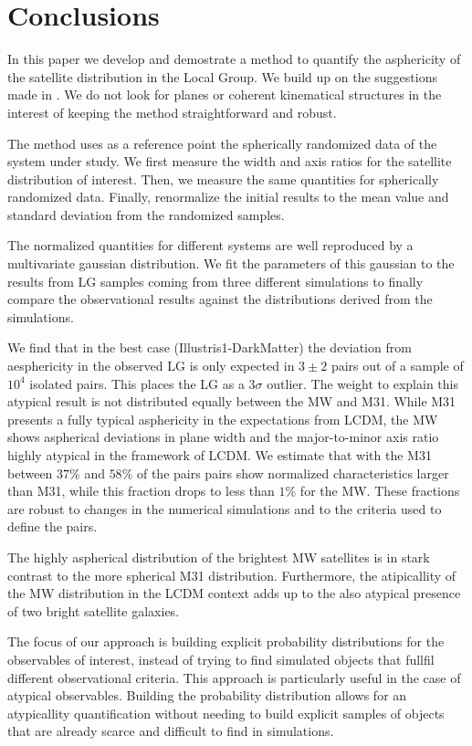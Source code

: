 \documentclass[a4paper,fleqn,usenatbib]{mnras}
\begin{document}
\section{Conclusions}

In this paper we develop and demostrate a method to quantify the
asphericity of the satellite distribution in the Local Group.
We build up on the suggestions made in \cite{XX}.
We do not look for planes or coherent kinematical structures in the
interest of keeping the method straightforward and robust.

The method uses as a reference point the spherically randomized data
of the system under study.
We first measure the width and axis ratios for the satellite
distribution of interest. 
Then, we measure the same quantities for spherically
randomized data. 
Finally, renormalize the initial results to the mean value and
standard deviation from the randomized samples.  

The normalized quantities for different systems are well reproduced by
a multivariate gaussian distribution. 
We fit the parameters of this gaussian to the results from 
LG samples coming from three different simulations
to finally compare the observational results against the distributions
derived from the simulations.


We find that in the best case (Illustris1-DarkMatter) the deviation
from aesphericity in the observed LG is only  expected in $3\pm2$
pairs out of a sample of $10^4$ isolated pairs. This places the LG as
a $3\sigma$ outlier.   
The weight to explain this atypical result is not distributed equally
between the MW and M31. 
While M31 presents a fully typical asphericity in the expectations
from LCDM, the MW shows aspherical deviations in plane width and the
major-to-minor axis ratio highly atypical in the 
framework of LCDM. 
We estimate that with the M31 between $37\%$ and $58\%$ of the pairs
pairs show normalized characteristics larger than M31, while
this fraction drops to less than $1\%$ for the MW.
These fractions are robust to changes in the numerical simulations and to
the criteria used to define the pairs.


The highly aspherical distribution of the brightest MW satellites is
in stark contrast to the more spherical M31 distribution.
Furthermore, the atipicallity of the MW distribution in the LCDM
context adds up to the also atypical presence of two bright satellite
galaxies.


The focus of our approach is building explicit probability
distributions for the observables of interest, instead of trying to
find simulated objects that fullfil different observational criteria. 
This approach is particularly useful in the case of atypical
observables. 
Building the probability distribution allows for an atypicallity
quantification without needing to build explicit samples of objects
that are already scarce and difficult to find in simulations.
\end{document}

